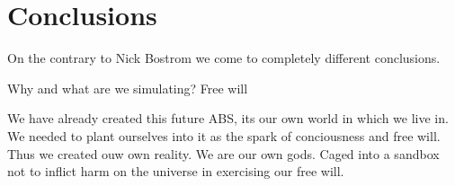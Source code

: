 \section{Conclusions}

On the contrary to Nick Bostrom we come to completely different conclusions.

Why and what are we simulating? Free will

We have already created this future ABS, its our own world in which we live in. We needed to plant ourselves into it as the spark of conciousness and free will. Thus we created ouw own reality. We are our own gods. Caged into a sandbox not to inflict harm on the universe in exercising our free will.